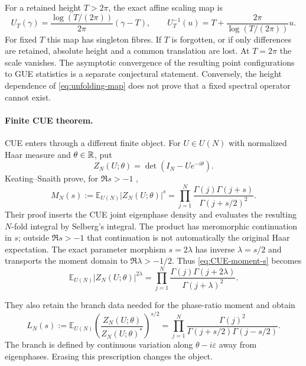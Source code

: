 For a retained height $T>2\pi$, the exact affine scaling map is
\begin{equation}
 U_T(\gamma)=\frac{\log(T/(2\pi))}{2\pi}(\gamma-T),
 \qquad
 U_T^{-1}(u)=T+\frac{2\pi}{\log(T/(2\pi))}u.
 \label{eq:unfolding-map}
\end{equation}
For fixed $T$ this map has singleton fibres.  If $T$ is forgotten, or if only differences are
retained, absolute height and a common translation are lost.  At $T=2\pi$ the scale vanishes.
The asymptotic convergence of the resulting point configurations to GUE statistics is a
separate conjectural statement.  Conversely, the height dependence of
\eqref{eq:unfolding-map} does not prove that a fixed spectral operator cannot exist.

\paragraph{Finite CUE theorem.}
CUE enters through a different finite object.  For $U\in U(N)$ with normalized Haar measure
and $\theta\in\mathbb R$, put
\begin{equation}
 Z_N(U;\theta)=\det(I_N-Ue^{-i\theta}).
 \label{eq:CUE-characteristic}
\end{equation}
Keating--Snaith prove, for $\Re s>-1$
\cite[pp.~57--64, eqs.~(1), (6), and~(20)--(26)]{keatingSnaith2000},
\begin{equation}
 M_N(s):=\mathbb E_{U(N)}|Z_N(U;\theta)|^s
 =\prod_{j=1}^N
 \frac{\Gamma(j)\Gamma(j+s)}{\Gamma(j+s/2)^2}.
 \label{eq:CUE-moment-s}
\end{equation}
Their proof inserts the CUE joint eigenphase density and evaluates the resulting $N$-fold
integral by Selberg's integral.  The product has meromorphic continuation in $s$; outside
$\Re s>-1$ that continuation is not automatically the original Haar expectation.  The exact
parameter morphism $s=2\lambda$ has inverse $\lambda=s/2$ and transports the moment domain
to $\Re\lambda>-1/2$.  Thus \eqref{eq:CUE-moment-s} becomes
\begin{equation}
 \mathbb E_{U(N)}|Z_N(U;\theta)|^{2\lambda}
 =\prod_{j=1}^N
 \frac{\Gamma(j)\Gamma(j+2\lambda)}{\Gamma(j+\lambda)^2}.
 \label{eq:CUE-moment}
\end{equation}

They also retain the branch data needed for the phase-ratio moment and obtain
\cite[eqs.~(7) and~(27)--(33)]{keatingSnaith2000}
\begin{equation}
 L_N(s):=\mathbb E_{U(N)}
 \left(\frac{Z_N(U;\theta)}{Z_N(U;\theta)^*}\right)^{s/2}
 =\prod_{j=1}^N
 \frac{\Gamma(j)^2}{\Gamma(j+s/2)\Gamma(j-s/2)}.
 \label{eq:CUE-phase-moment}
\end{equation}
The branch is defined by continuous variation along $\theta-i\varepsilon$ away from
eigenphases.  Erasing this prescription changes the object.

